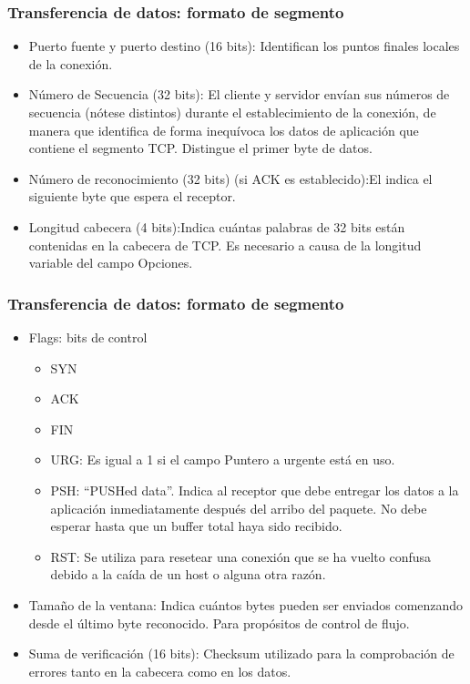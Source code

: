 \documentclass{beamer}
\begin{document}
\begin{frame}
\frametitle{Transferencia de datos: formato de segmento}
\begin{itemize}
\item Puerto fuente y puerto destino (16 bits): Identifican los puntos finales locales de la conexión.
\item Número de Secuencia (32 bits): El cliente y servidor envían sus números de secuencia (nótese distintos) durante el establecimiento de la conexión, de manera que identifica de forma inequívoca los datos de aplicación que contiene el segmento TCP. Distingue el primer byte de datos.
\item Número de reconocimiento (32 bits) (si ACK es establecido):El indica el siguiente byte que espera el receptor.
\item Longitud cabecera (4 bits):Indica cuántas palabras de 32 bits están contenidas en la cabecera de TCP. Es necesario a causa de la longitud variable del campo Opciones.
\end{itemize}
\end{frame}

\begin{frame}
\frametitle{Transferencia de datos: formato de segmento}
\begin{itemize}
\item Flags: bits de control
\begin{itemize}
\item SYN
\item ACK
\item FIN
\item URG: Es igual a 1 si el campo Puntero a urgente está en uso. 
\item PSH: “PUSHed data”. Indica al receptor que debe entregar los datos a la aplicación inmediatamente después del arribo del paquete. No debe esperar hasta que un buffer total haya sido recibido.
\item RST: Se utiliza para resetear una conexión que se ha vuelto confusa debido a la caída de un host o alguna otra razón.
\end{itemize}
\item Tamaño de la ventana: Indica cuántos bytes pueden ser enviados comenzando desde el último byte reconocido. Para propósitos de control de flujo.
\item Suma de verificación (16 bits): Checksum utilizado para la comprobación de errores tanto en la cabecera como en los datos.
\end{itemize}
\end{frame}
\end{document}
